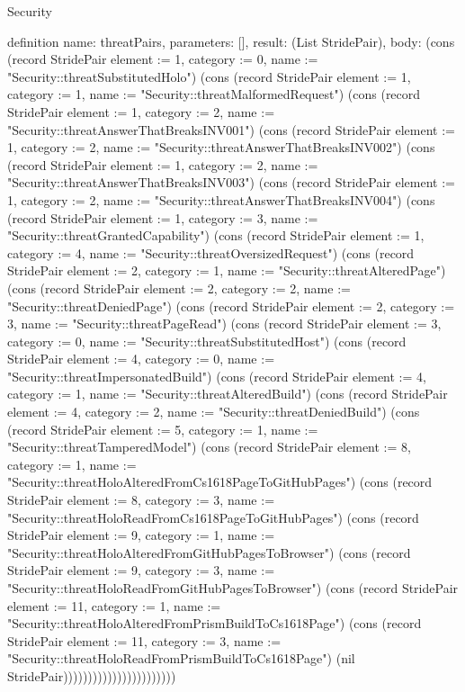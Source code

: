\begin{lexlean}{Security}
\begin{semanticmodule}
definition{
  name: threatPairs,
  parameters: [],
  result: (List StridePair),
  body: (cons (record StridePair {element := 1, category := 0, name := "Security::threatSubstitutedHolo"}) (cons (record StridePair {element := 1, category := 1, name := "Security::threatMalformedRequest"}) (cons (record StridePair {element := 1, category := 2, name := "Security::threatAnswerThatBreaksINV001"}) (cons (record StridePair {element := 1, category := 2, name := "Security::threatAnswerThatBreaksINV002"}) (cons (record StridePair {element := 1, category := 2, name := "Security::threatAnswerThatBreaksINV003"}) (cons (record StridePair {element := 1, category := 2, name := "Security::threatAnswerThatBreaksINV004"}) (cons (record StridePair {element := 1, category := 3, name := "Security::threatGrantedCapability"}) (cons (record StridePair {element := 1, category := 4, name := "Security::threatOversizedRequest"}) (cons (record StridePair {element := 2, category := 1, name := "Security::threatAlteredPage"}) (cons (record StridePair {element := 2, category := 2, name := "Security::threatDeniedPage"}) (cons (record StridePair {element := 2, category := 3, name := "Security::threatPageRead"}) (cons (record StridePair {element := 3, category := 0, name := "Security::threatSubstitutedHost"}) (cons (record StridePair {element := 4, category := 0, name := "Security::threatImpersonatedBuild"}) (cons (record StridePair {element := 4, category := 1, name := "Security::threatAlteredBuild"}) (cons (record StridePair {element := 4, category := 2, name := "Security::threatDeniedBuild"}) (cons (record StridePair {element := 5, category := 1, name := "Security::threatTamperedModel"}) (cons (record StridePair {element := 8, category := 1, name := "Security::threatHoloAlteredFromCs1618PageToGitHubPages"}) (cons (record StridePair {element := 8, category := 3, name := "Security::threatHoloReadFromCs1618PageToGitHubPages"}) (cons (record StridePair {element := 9, category := 1, name := "Security::threatHoloAlteredFromGitHubPagesToBrowser"}) (cons (record StridePair {element := 9, category := 3, name := "Security::threatHoloReadFromGitHubPagesToBrowser"}) (cons (record StridePair {element := 11, category := 1, name := "Security::threatHoloAlteredFromPrismBuildToCs1618Page"}) (cons (record StridePair {element := 11, category := 3, name := "Security::threatHoloReadFromPrismBuildToCs1618Page"}) (nil StridePair)))))))))))))))))))))))
}


\end{semanticmodule}
\end{lexlean}
